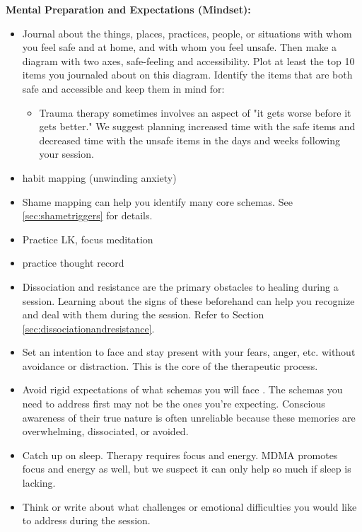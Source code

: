 \documentclass[12pt,letterpaper]{book}
\begin{document}
\noindent \textbf{Mental Preparation and Expectations (Mindset):}
\begin{itemize}
    \label{safetymapping}
    \item Journal about the things, places, practices, people, or situations with whom you feel safe and at home, and with whom you feel unsafe. Then make a diagram with two axes, safe-feeling and accessibility. Plot at least the top 10 items you journaled about on this diagram. Identify the items that are both safe and accessible and keep them in mind for:
    \begin{itemize}
        \item Trauma therapy sometimes involves an aspect of "it gets worse before it gets better." We suggest planning increased time with the safe items and decreased time with the unsafe items in the days and weeks following your session.
    \end{itemize}
    \item habit mapping (unwinding anxiety)
    \item Shame mapping can help you identify many core schemas. See \ref{sec:shametriggers} for details.
    \item Practice LK, focus meditation 
    \item practice thought record
    \item Dissociation and resistance are the primary obstacles to healing during a session. Learning about the signs of these beforehand can help you recognize and deal with them during the session. Refer to Section \ref{sec:dissociationandresistance}.
    \item Set an intention to face and stay present with your fears, anger, etc. without avoidance or distraction. This is the core of the therapeutic process.
    \item Avoid rigid expectations of what schemas you will face \cite{mithoeferManual}. The schemas you need to address first may not be the ones you're expecting. Conscious awareness of their true nature is often unreliable because these memories are overwhelming, dissociated, or avoided.
    \item Catch up on sleep. Therapy requires focus and energy. MDMA promotes focus and energy as well, but we suspect it can only help so much if sleep is lacking.
    \item Think or write about what challenges or emotional difficulties you would like to address during the session.

\end{itemize}
\end{document}
